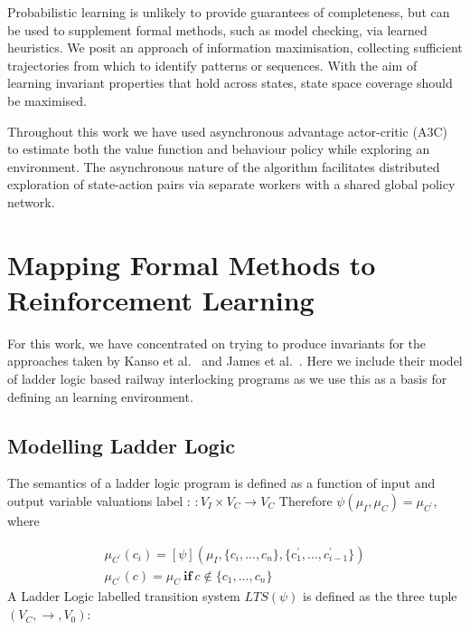 \documentclass[conference,compsoc]{IEEEtran}
\begin{document}
Probabilistic learning is unlikely to provide guarantees of completeness, but can be used to supplement formal methods, such as model checking, via learned heuristics. We posit an approach of information maximisation, collecting sufficient trajectories from which to identify patterns or sequences. With the aim of learning invariant properties that hold across states, state space coverage should be maximised. 

Throughout this work we have used asynchronous advantage actor-critic (A3C) to estimate both the value function and behaviour policy while exploring an environment. The asynchronous nature of the algorithm facilitates distributed exploration of state-action pairs via separate workers with a shared global policy network.


\section{Mapping Formal Methods to Reinforcement Learning} \label{sec:mapping_fm_to_ml}
For this work, we have concentrated on trying to produce invariants for the approaches taken by Kanso et al.~\cite{kanso2009automated} and James et al.~\cite{james2013verification}. Here we include their model of ladder logic based railway interlocking programs as we use this as a basis for defining an  learning environment. 
\subsection{Modelling Ladder Logic}
The semantics of a ladder logic program is defined as a function of input and output variable valuations  label :
\begin{math}
	[\psi] : V_I \times V_C \to V_C 
\end{math}
 Therefore
 \begin{math}
 	\psi(\mu_I, \mu_C) = \mu_{C^\prime}
 \end{math}, where

\begin{align}
\mu_{C^\prime}(c_i) = [\psi](\mu_I, \{c_i,...,c_n\}, \{c^\prime_1,...,c^\prime_{i-1}\}) \\
\mu_{C^\prime}(c) = \mu_C \ \mathbf{if} \ c \notin \{c_1,...,c_n\}
\end{align}
A Ladder Logic labelled transition system $LTS(\psi)$ is defined as the three tuple $(V_C, \to, V_0)$:
\end{document}
